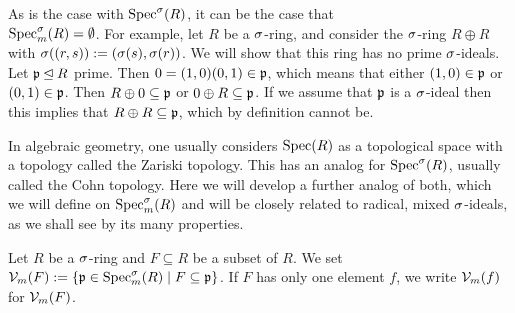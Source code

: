 \begin{rem}
As is the case with $\operatorname{Spec}^\sigma(R)$, it can be the case that \\ $\operatorname{Spec}^\sigma_m(R)= \emptyset$. For example, let $R$ be a $\sigma$-ring, and consider the $\sigma$-ring $R \oplus R$ with $\sigma( (r,s)):= (\sigma(s),\sigma(r))$. 
We will show that this ring has no prime $\sigma$-ideals. Let $\mathfrak{p} \unlhd R$ prime. Then $0 = (1,0)(0,1) \in \mathfrak{p}$, which means that either $(1,0) \in \mathfrak{p}$ or $(0,1) \in \mathfrak{p}$. Then $R \oplus 0 \subseteq \mathfrak{p}$ or $0 \oplus R \subseteq \mathfrak{p}$. If we assume that $\mathfrak{p}$ is a $\sigma$-ideal then
 this implies that $R \oplus R \subseteq \mathfrak{p}$, which by definition cannot be.
\end{rem}

In algebraic geometry, one usually considers $\operatorname{Spec}(R)$ as a topological space with a topology called the Zariski topology. This has an analog for $\operatorname{Spec}^\sigma(R)$, usually called the Cohn topology. Here we will develop a further analog of both,
 which we will define on $\operatorname{Spec}^\sigma_m(R)$ and will be closely related to radical, mixed $\sigma$-ideals, as we shall see by its many properties.

\begin{defn}
Let $R$ be a $\sigma$-ring and $F \subseteq R$ be a subset of $R$. We set $\mathcal{V}_m (F):= \{ \mathfrak{p} \in \operatorname{Spec}^\sigma_m(R) \mid F \subseteq \mathfrak{p} \}$. 
If $F$ has only one element $f$, we write $\mathcal{V}_m(f)$ for $\mathcal{V}_m(F)$. 
\end{defn}

